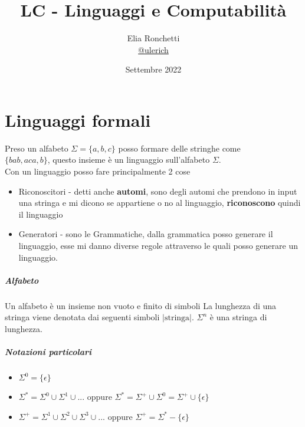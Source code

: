 \documentclass[12pt, a4paper, openany]{book}
\begin{document}
\title{LC - Linguaggi e Computabilità}
\author{Elia Ronchetti\\
    \small{\href{https://t.me/ulerich}{@ulerich}}}
\date{Settembre 2022}

\maketitle
\tableofcontents

\chapter{Linguaggi formali}
Preso un alfabeto $\Sigma=\{a,b,c\}$ posso formare delle stringhe come
\\ $\{bab, aca, b\}$, questo insieme è un linguaggio sull'alfabeto $\Sigma$.
\\ Con un linguaggio posso fare principalmente 2 cose
\begin{itemize}
    \item Riconoscitori - detti anche \textbf{automi}, sono degli automi che prendono in input
    una stringa e mi dicono se appartiene o no al linguaggio, \textbf{riconoscono} quindi il linguaggio
    \item Generatori - sono le Grammatiche, dalla grammatica posso generare il linguaggio,
    esse mi danno diverse regole attraverso le quali posso generare un linguaggio.
\end{itemize}
\paragraph*{Alfabeto} Un alfabeto è un insieme non vuoto e finito di simboli
La lunghezza di una stringa viene denotata dai seguenti simboli $|\text{stringa}|$.
$\Sigma^n$ è una stringa di lunghezza.
\paragraph*{Notazioni particolari}
\begin{itemize}
    \item $\Sigma^0 = \{\epsilon\}$
    \item $\Sigma^* = \Sigma^0 \cup \Sigma^1 \cup ...$ oppure $\Sigma^*=\Sigma^+ \cup \Sigma^0 = \Sigma^+ \cup \{\epsilon\}$
    \item $\Sigma^+ = \Sigma^1 \cup \Sigma^2 \cup \Sigma^3 \cup ...$ oppure $\Sigma^+ = \Sigma^* - \{\epsilon\}$
\end{itemize}
\end{document}
